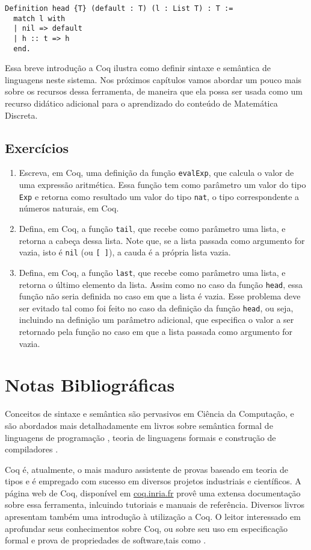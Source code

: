 \begin{lstlisting}
Definition head {T} (default : T) (l : List T) : T :=
  match l with
  | nil => default
  | h :: t => h
  end.
\end{lstlisting}

Essa breve introdução a Coq ilustra como definir sintaxe e semântica de linguagens neste sistema. Nos próximos capítulos vamos abordar um pouco mais sobre os recursos dessa ferramenta, de maneira que ela possa ser usada como um recurso did\'atico adicional para o aprendizado do conte\'udo de Matem\'atica Discreta.

\subsection{Exerc\'icios}

\begin{enumerate}
    \item Escreva, em Coq, uma definição da fun\c{c}\~ao \texttt{evalExp}, que calcula o valor de uma express\~ao aritm\'etica. Essa função tem como parâmetro um valor do tipo \texttt{Exp} e retorna como resultado um valor do tipo \texttt{nat}, o tipo correspondente a n\'umeros naturais, em Coq. 
    \item Defina, em Coq, a função \texttt{tail}, que recebe como parâmetro uma lista, e retorna a cabeça dessa lista. Note que, se a lista passada como argumento for vazia, isto é \texttt{nil} (ou \texttt{[\,]}), a cauda é a própria lista vazia.
        \item Defina, em Coq, a função \texttt{last}, que recebe como parâmetro uma lista, e retorna o último elemento da lista. Assim como no caso da função \texttt{head}, essa função não seria definida no caso em que a lista é vazia. Esse problema deve ser evitado tal como foi feito no caso da definição da função \texttt{head}, ou seja, incluindo na definição um parâmetro adicional, que especifica o valor a ser retornado pela função no caso em que a lista passada como argumento for vazia. 

\end{enumerate}

\section{Notas Bibliogr\'aficas}

Conceitos de sintaxe e sem\^antica s\~ao pervasivos em Ci\^encia da
Computa\c{c}\~ao, e s\~ao abordados mais detalhadamente em livros sobre sem\^antica
formal de linguagens de programação \cite{Winskel93}, teoria de linguagens formais \cite{Sipser12, Hopcroft06} e constru\c{c}\~ao de compiladores \cite{Aho86}.

Coq \'e, atualmente, o mais maduro assistente de provas baseado em
teoria de tipos e \'e empregado com sucesso em diversos projetos
industriais e cient\'ificos. A página web de Coq, disponível em \url{coq.inria.fr} provê uma extensa documentação sobre essa ferramenta, inlcuindo tutoriais e manuais de referência. Diversos livros apresentam também uma introdu\c{c}\~ao \`a utiliza\c{c}\~ao a Coq. O leitor interessado em aprofundar seus
conhecimentos sobre Coq, ou sobre seu uso em especificação formal e prova de propriedades de software,tais como \cite{coqart,Pierce12,Coqrefman}.
